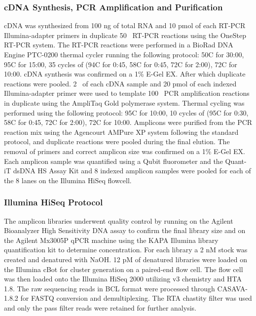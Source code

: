 \subsubsection{cDNA Synthesis, PCR Amplification and Purification}
cDNA was synthesized from 100 ng of total RNA and 10 pmol of each RT-PCR Illumina-adapter primers in duplicate 50 \microliter~RT-PCR reactions using the OneStep RT-PCR system. The RT-PCR reactions were performed in a BioRad DNA Engine PTC-0200 thermal cycler running the following protocol: 50\degree C for 30:00, 95\degree C for 15:00, 35 cycles of (94\degree C for 0:45, 58\degree C for 0:45, 72\degree C for 2:00), 72\degree C for 10:00. cDNA synthesis was confirmed on a 1\% E-Gel EX. After which duplicate reactions were pooled. 2 \microliter~of each cDNA sample and 20 pmol of each indexed Illumina-adapter primer were used to template 100 \microliter~PCR amplification reactions in duplicate using the AmpliTaq Gold polymerase system. Thermal cycling was performed using the following protocol: 95\degree C for 10:00, 10 cycles of (95\degree C for 0:30, 58\degree C for 0:45, 72\degree C for 2:00), 72\degree C for 10:00. Amplicons were purified from the PCR reaction mix using the Agencourt AMPure XP system following the standard protocol, and duplicate reactions were pooled during the final elution. The removal of primers and correct amplicon size was confirmed on a 1\% E-Gel EX. Each amplicon sample was quantified using a Qubit fluorometer and the Quant-iT\textsuperscript{\textregistered} dsDNA HS Assay Kit and 8 indexed amplicon samples were pooled for each of the 8 lanes on the Illumina HiSeq flowcell.

\subsubsection{Illumina HiSeq Protocol}
The amplicon libraries underwent quality control by running on the Agilent Bioanalyzer High Sensitivity DNA assay to confirm the final library size and on the Agilent Mx3005P qPCR machine using the KAPA Illumina library quantification kit to determine concentration. For each library a 2 nM stock was created and denatured with NaOH. 12 pM of denatured libraries were loaded on the Illumina cBot for cluster generation on a paired-end flow cell. The flow cell was then loaded onto the Illumina HiSeq 2000 utilizing v3 chemistry and HTA 1.8. The raw sequencing reads in BCL format were processed through CASAVA-1.8.2 for FASTQ conversion and demultiplexing. The RTA chastity filter was used and only the pass filter reads were retained for further analysis.

